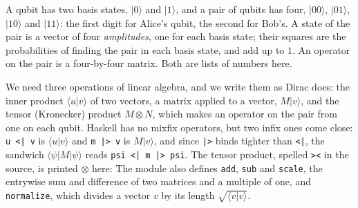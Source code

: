 \documentclass[11pt]{article}
\newcommand{\hs}{\lstinline[style=hask,basicstyle=\ttfamily,frame=none]}
\begin{document}
A qubit has two basis states, $|0\rangle$ and $|1\rangle$, and a pair of qubits has four, $|00\rangle$, $|01\rangle$, $|10\rangle$ and $|11\rangle$: the first digit for Alice's qubit, the second for Bob's. A state of the pair is a vector of four \emph{amplitudes}, one for each basis state; their squares are the probabilities of finding the pair in each basis state, and add up to $1$. An operator on the pair is a four-by-four matrix. Both are lists of numbers here.

We need three operations of linear algebra, and we write them as Dirac does: the inner product $\langle u|v\rangle$ of two vectors, a matrix applied to a vector, $M|v\rangle$, and the tensor (Kronecker) product $M \otimes N$, which makes an operator on the pair from one on each qubit. Haskell has no mixfix operators, but two infix ones come close: \hs!u <| v! is $\langle u|v\rangle$ and \hs!m |> v! is $M|v\rangle$, and since \hs!|>! binds tighter than \hs!<|!, the sandwich $\langle\psi|M|\psi\rangle$ reads \hs!psi <| m |> psi!. The tensor product, spelled \texttt{>{}<} in the source, is printed $\otimes$ here:
The module also defines \hs|add|, \hs|sub| and \hs|scale|, the entrywise sum and difference of two matrices and a multiple of one, and \hs|normalize|, which divides a vector $v$ by its length $\sqrt{\langle v|v\rangle}$.
\end{document}
